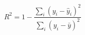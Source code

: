 \documentclass{article}
\begin{document}
\[
R^2 = 1 - \frac{\sum_i (y_i - \hat{y}_i)^2}{\sum_i (y_i - \bar{y})^2}
\]
\pagebreak
\end{document}
